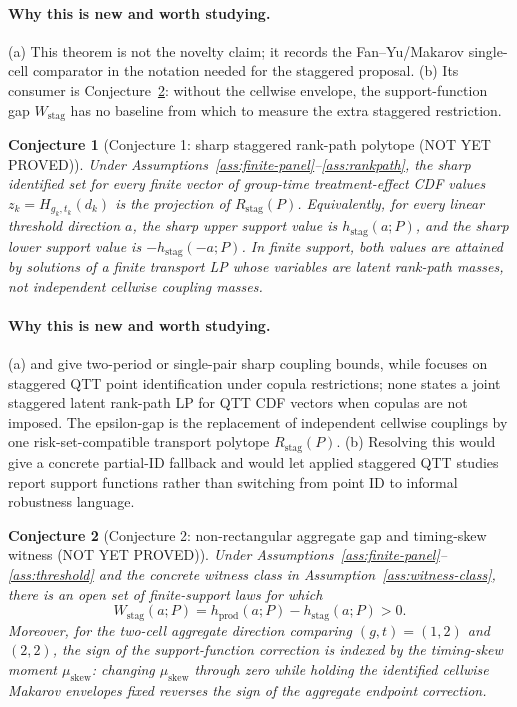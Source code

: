 \documentclass[11pt]{article}
\theoremstyle{definition}
\theoremstyle{plain}
\newtheorem{conjecture}{Conjecture}
\theoremstyle{remark}
\begin{document}
\paragraph{Why this is new and worth studying.}
(a) This theorem is not the novelty claim; it records the Fan--Yu/Makarov single-cell comparator in the notation needed for the staggered proposal.  (b) Its consumer is Conjecture~\ref{conj:nonrectangularity}: without the cellwise envelope, the support-function gap \(W_{\mathrm{stag}}\) has no baseline from which to measure the extra staggered restriction.

\begin{conjecture}[Conjecture 1: sharp staggered rank-path polytope (NOT YET PROVED)]\label{conj:rankpath-sharp}
Under Assumptions~\ref{ass:finite-panel}--\ref{ass:rankpath}, the sharp identified set for every finite vector of group-time treatment-effect CDF values \(z_k=H_{g_k,t_k}(d_k)\) is the projection of \(R_{\mathrm{stag}}(P)\).  Equivalently, for every linear threshold direction \(a\), the sharp upper support value is \(h_{\mathrm{stag}}(a;P)\), and the sharp lower support value is \(-h_{\mathrm{stag}}(-a;P)\).  In finite support, both values are attained by solutions of a finite transport LP whose variables are latent rank-path masses, not independent cellwise coupling masses.
\end{conjecture}
\paragraph{Why this is new and worth studying.}
(a) \citet{FanYu2012} and \citet{FanPark2010} give two-period or single-pair sharp coupling bounds, while \citet{LiLin2024} focuses on staggered QTT point identification under copula restrictions; none states a joint staggered latent rank-path LP for QTT CDF vectors when copulas are not imposed.  The epsilon-gap is the replacement of independent cellwise couplings by one risk-set-compatible transport polytope \(R_{\mathrm{stag}}(P)\).  (b) Resolving this would give \citet{LiLin2024} a concrete partial-ID fallback and would let applied staggered QTT studies report support functions rather than switching from point ID to informal robustness language.

\begin{conjecture}[Conjecture 2: non-rectangular aggregate gap and timing-skew witness (NOT YET PROVED)]\label{conj:nonrectangularity}
Under Assumptions~\ref{ass:finite-panel}--\ref{ass:threshold} and the concrete witness class in Assumption~\ref{ass:witness-class}, there is an open set of finite-support laws for which
\[
W_{\mathrm{stag}}(a;P)=h_{\mathrm{prod}}(a;P)-h_{\mathrm{stag}}(a;P)>0.
\]
Moreover, for the two-cell aggregate direction comparing \((g,t)=(1,2)\) and \((2,2)\), the sign of the support-function correction is indexed by the timing-skew moment \(\mu_{\mathrm{skew}}\): changing \(\mu_{\mathrm{skew}}\) through zero while holding the identified cellwise Makarov envelopes fixed reverses the sign of the aggregate endpoint correction.
\end{conjecture}
\end{document}
